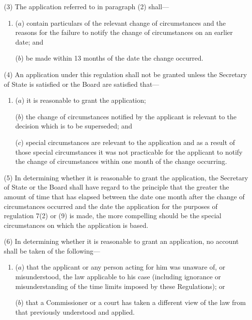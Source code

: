 \documentclass[12pt,a4paper]{article}
\begin{document}
(3) The application referred to in paragraph (2) shall—
\begin{enumerate}\item[]
($a$) contain particulars of the relevant change of circumstances and the reasons for the failure to notify the change of circumstances on an earlier date; and

($b$) be made within 13 months of the date the change occurred.
\end{enumerate}

(4) An application under this regulation shall not be granted unless the Secretary of State is satisfied 
or the Board are satisfied  %
that—
\begin{enumerate}\item[]
($a$) it is reasonable to grant the application;

($b$) the change of circumstances notified by the applicant is relevant to the decision which is to be superseded; and

($c$) special circumstances are relevant to the application and as a result of those special circumstances it was not practicable for the applicant to notify the change of circumstances within one month of the change occurring.
\end{enumerate}

(5) In determining whether it is reasonable to grant the application, the Secretary of State 
or the Board  %
shall have regard to the principle that the greater the amount of time that has elapsed between the date one month after the change of circumstances occurred and the date the application for the purposes of regulation 7(2) 
or (9)  %
is made, the more compelling should be the special circumstances on which the application is based.

(6) In determining whether it is reasonable to grant an application, no account shall be taken of the following—
\begin{enumerate}\item[]
($a$) that the applicant or any person acting for him was unaware of, or misunderstood, the law applicable to his case (including ignorance or misunderstanding of the time limits imposed by these Regulations); or

($b$) that a Commissioner or a court has taken a different view of the law from that previously understood and applied.
\end{enumerate}
\end{document}
